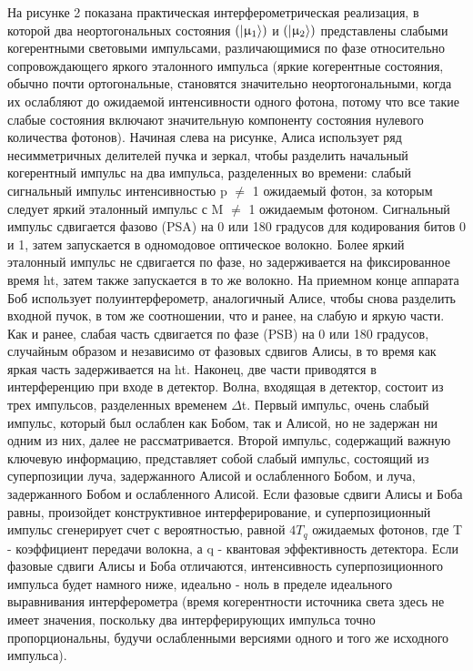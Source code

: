 На рисунке 2 показана практическая интерферометрическая реализация, в которой два неортогональных состояния $(\lvert\upmu_1\rangle)$ и $(\lvert\upmu_2\rangle)$ представлены слабыми когерентными световыми импульсами, различающимися по фазе относительно сопровождающего яркого эталонного импульса (яркие когерентные состояния, обычно почти ортогональные, становятся значительно неортогональными, когда их ослабляют до ожидаемой интенсивности одного фотона, потому что все такие слабые состояния включают значительную компоненту состояния нулевого количества фотонов). Начиная слева на рисунке, Алиса использует ряд несимметричных делителей пучка и зеркал, чтобы разделить начальный когерентный импульс на два импульса, разделенных во времени: слабый сигнальный импульс интенсивностью p $\neq$ 1 ожидаемый фотон, за которым следует яркий эталонный импульс с M $\neq$ 1 ожидаемым фотоном. Сигнальный импульс сдвигается фазово (PSA) на 0 или 180 градусов для кодирования битов 0 и 1, затем запускается в одномодовое оптическое волокно. Более яркий эталонный импульс не сдвигается по фазе, но задерживается на фиксированное время ht, затем также запускается в то же волокно. На приемном конце аппарата Боб использует полуинтерферометр, аналогичный Алисе, чтобы снова разделить входной пучок, в том же соотношении, что и ранее, на слабую и яркую части. Как и ранее, слабая часть сдвигается по фазе (PSB) на 0 или 180 градусов, случайным образом и независимо от фазовых сдвигов Алисы, в то время как яркая часть задерживается на ht. Наконец, две части приводятся в интерференцию при входе в детектор.
Волна, входящая в детектор, состоит из трех импульсов, разделенных временем $\Delta$t. Первый импульс, очень слабый импульс, который был ослаблен как Бобом, так и Алисой, но не задержан ни одним из них, далее не рассматривается.
Второй импульс, содержащий важную ключевую информацию, представляет собой слабый импульс, состоящий из суперпозиции луча, задержанного Алисой и ослабленного Бобом, и луча, задержанного Бобом и ослабленного Алисой. Если фазовые сдвиги Алисы и Боба равны, произойдет конструктивное интерферирование, и суперпозиционный импульс сгенерирует счет с вероятностью, равной $4T_q$ ожидаемых фотонов, где T - коэффициент передачи волокна, а q - квантовая эффективность детектора. Если фазовые сдвиги Алисы и Боба отличаются, интенсивность суперпозиционного импульса будет намного ниже, идеально - ноль в пределе идеального выравнивания интерферометра (время когерентности источника света здесь не имеет значения, поскольку два интерферирующих импульса точно пропорциональны, будучи ослабленными версиями одного и того же исходного импульса).
